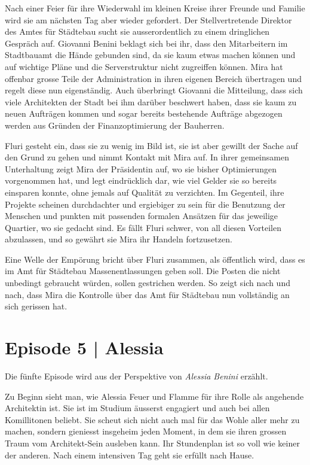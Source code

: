 \documentclass[11pt,a4paper,ngerman]{scrreprt}
\begin{document}
Nach einer Feier für ihre Wiederwahl im kleinen Kreise ihrer Freunde und Familie
wird sie am nächsten Tag aber wieder gefordert. Der Stellvertretende Direktor
des Amtes für Städtebau sucht sie ausserordentlich zu einem dringlichen Gespräch
auf. Giovanni Benini beklagt sich bei ihr, dass den Mitarbeitern im Stadtbauamt
die Hände gebunden sind, da sie kaum etwas machen können und auf wichtige Pläne
und die Serverstruktur nicht zugreiffen können. Mira hat offenbar grosse Teile
der Administration in ihren eigenen Bereich übertragen und regelt diese nun
eigenständig. Auch überbringt Giovanni die Mitteilung, dass sich viele
Architekten der Stadt bei ihm darüber beschwert haben, dass sie kaum zu neuen
Aufträgen kommen und sogar bereits bestehende Aufträge abgezogen werden aus
Gründen der Finanzoptimierung der Bauherren.

Fluri gesteht ein, dass sie zu wenig im Bild ist, sie ist aber gewillt der
Sache auf den Grund zu gehen und nimmt Kontakt mit Mira auf. In ihrer
gemeinsamen Unterhaltung zeigt Mira der Präsidentin auf, wo sie bisher
Optimierungen vorgenommen hat, und legt eindrücklich dar, wie viel Gelder sie so
bereits einsparen konnte, ohne jemals auf Qualität zu verzichten. Im Gegenteil,
ihre Projekte scheinen durchdachter und ergiebiger zu sein für die Benutzung der
Menschen und punkten mit passenden formalen Ansätzen für das jeweilige Quartier,
wo sie gedacht sind. Es fällt Fluri schwer, von all diesen Vorteilen
abzulassen, und so gewährt sie Mira ihr Handeln fortzusetzen.

Eine Welle der Empörung bricht über Fluri zusammen, als öffentlich wird, dass
es im Amt für Städtebau Massenentlassungen geben soll. Die Posten die nicht
unbedingt gebraucht würden, sollen gestrichen werden. So zeigt sich nach und
nach, dass Mira die Kontrolle über das Amt für Städtebau nun vollständig an sich
gerissen hat.

\section*{Episode 5 | Alessia}

Die fünfte Episode wird aus der Perspektive von \emph{Alessia Benini} erzählt.

Zu Beginn sieht man, wie Alessia Feuer und Flamme für ihre Rolle als angehende
Architektin ist. Sie ist im Studium äusserst engagiert und auch bei allen
Komillitonen beliebt. Sie scheut sich nicht auch mal für das Wohle aller mehr zu
machen, sondern gieniesst insgeheim jeden Moment, in dem sie ihren grossen Traum
vom Architekt-Sein ausleben kann. Ihr Stundenplan ist so voll wie keiner der
anderen. Nach einem intensiven Tag geht sie erfüllt nach Hause.
\end{document}
